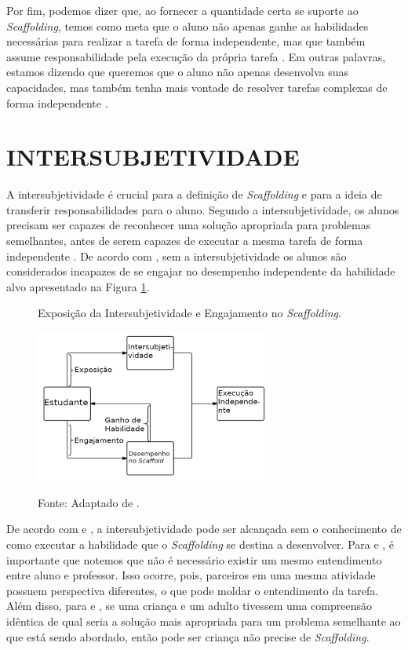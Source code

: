 Por fim, podemos dizer que, ao fornecer a quantidade certa se suporte ao \textit{Scaffolding}, temos como meta que o aluno não apenas ganhe as habilidades necessárias para realizar a tarefa de forma independente, mas que também assume responsabilidade pela execução da própria tarefa \cite{wood1976,Belland2014, Belland2017}. Em outras palavras, estamos dizendo que queremos que o aluno não apenas desenvolva suas capacidades, mas também tenha mais vontade de resolver tarefas complexas de forma independente \cite{Belland2013, Belland2017}. 

\section{INTERSUBJETIVIDADE}

A intersubjetividade é crucial para a definição de \textit{Scaffolding} e para a ideia de transferir responsabilidades para o aluno. Segundo a intersubjetividade, os alunos precisam ser capazes de reconhecer uma solução apropriada para problemas semelhantes, antes de serem capazes de executar a mesma tarefa de forma independente \cite{wood1976,Mortimer2009,Mahardale2014,Belland2017}. De acordo com , sem a intersubjetividade os alunos são considerados incapazes de se engajar no desempenho independente da habilidade alvo apresentado na Figura \ref{fig:intersubjetividade}. 

\begin{figure}[htp]
\begin{center}
\caption{Exposição da Intersubjetividade e Engajamento no \textit{Scaffolding}.}
\includegraphics[width=0.7\textwidth]{fig/intersubjetividade.png}
\label{fig:intersubjetividade}
\caption*{Fonte: Adaptado de .}
\end{center}
\end{figure}

De acordo com  e , a intersubjetividade pode ser alcançada sem o conhecimento de como executar a habilidade que o \textit{Scaffolding} se destina a desenvolver. Para  e , é importante que notemos que não é necessário existir um mesmo entendimento entre aluno e professor.  Isso ocorre, pois, parceiros em uma mesma atividade possuem perspectiva diferentes, o que pode moldar o entendimento da tarefa. Além disso, para  e \cite{wertsch1985zone}, se uma criança e um adulto tivessem uma compreensão idêntica de qual seria a solução mais apropriada para um problema semelhante ao que está sendo abordado, então pode ser criança não precise de \textit{Scaffolding}. 

